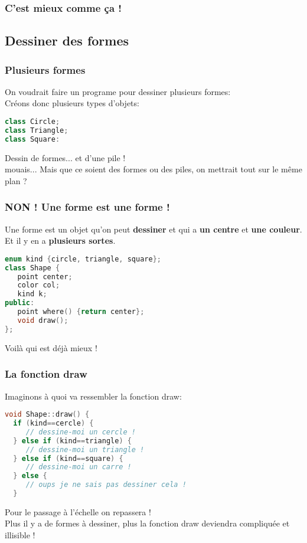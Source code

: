 \documentclass{beamer}
\begin{document}
\begin{frame}
\frametitle{C'est mieux comme ça !}
\begin{centering}
%
\par%
\end{centering}%
\end{frame}

\subsection{Dessiner des formes}
\begin{frame}[fragile=singleslide,shrink=20]
\frametitle{Plusieurs formes}
On voudrait faire un programe pour dessiner plusieurs formes: \\
Créons donc plusieurs types d'objets:
\begin{lstlisting}[language=c++]
class Circle;
class Triangle;
class Square:
\end{lstlisting}
Dessin de formes... et d'une pile ! \\
mouais... Mais que ce soient des formes ou des piles, on mettrait tout sur le même plan ?
\end{frame}

\begin{frame}[fragile=singleslide,shrink=20]
\frametitle{NON ! Une forme est une forme !}
Une forme est un objet qu'on peut \textbf{dessiner} et qui a \textbf{un centre} et \textbf{une couleur}.\\
Et il y en a \textbf{plusieurs sortes}.
\begin{lstlisting}[language=c++]
enum kind {circle, triangle, square};
class Shape {
   point center;
   color col;
   kind k;
public:
   point where() {return center};
   void draw();
};
\end{lstlisting}
Voilà qui est déjà mieux ! 
\end{frame}

\begin{frame}[fragile=singleslide,shrink=20]
\frametitle{La fonction draw}
Imaginons à quoi va ressembler la fonction draw:
\begin{lstlisting}[language=c++]
void Shape::draw() {
  if (kind==cercle) {
     // dessine-moi un cercle !
  } else if (kind==triangle) {
     // dessine-moi un triangle !
  } else if (kind==square) {
     // dessine-moi un carre !
  } else {
     // oups je ne sais pas dessiner cela !
  }
\end{lstlisting}
Pour le passage à l'échelle on repassera ! \\
Plus il y a de formes à dessiner, plus la fonction draw deviendra compliquée et illisible !
\end{frame}
  
\end{document}
